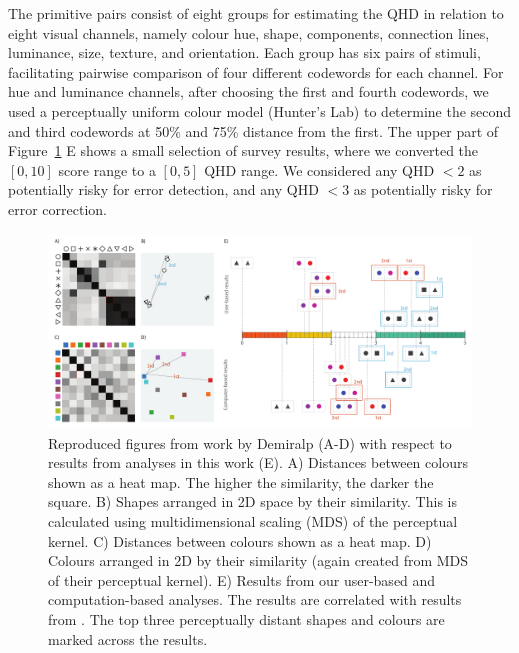 The primitive pairs consist of eight groups for estimating the QHD in relation to eight visual channels, namely colour hue, shape, components, connection lines, luminance, size, texture, and orientation.
Each group has six pairs of stimuli, facilitating pairwise comparison of four different codewords for each channel.
For hue and luminance channels, after choosing the first and fourth codewords, we used a perceptually uniform colour model (Hunter's Lab) \cite{hunter1958photoelectric} to determine the second and third codewords at 50\% and 75\% distance from the first.
The upper part of Figure~\ref{fig:eval_glyph_scores} E shows a small selection of survey results, where we converted the $[0, 10]$ score range to a $[0, 5]$ QHD range.
We considered any QHD $<2$ as potentially risky for error detection, and any QHD $<3$ as potentially risky for error correction.

\begin{figure}[t!]
\begin{center}
\includegraphics[width=\textwidth]{images/filesystem/perceptual_kernal_validation}
\end{center}
\caption{Reproduced figures from work by Demiralp \etal \cite{demiralplearning} (A-D) with respect to results from analyses in this work (E).
A) Distances between colours shown as a heat map.
The higher the similarity, the darker the square.
B) Shapes arranged in 2D space by their similarity. This is calculated using multidimensional scaling (MDS) of the perceptual kernel.
C) Distances between colours shown as a heat map.
D) Colours arranged in 2D by their similarity (again created from MDS of their perceptual kernel).
E) Results from our user-based and computation-based analyses.
The results are correlated with results from \cite{demiralplearning}.
The top three perceptually distant shapes and colours are marked across the results.}
\label{fig:eval_glyph_scores}
\end{figure}

